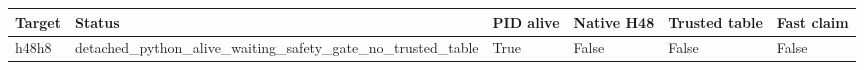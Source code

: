{\small
\begin{tabular}{llllll}
\hline
Target & Status & PID alive & Native H48 & Trusted table & Fast claim \\
\hline
h48h8 & detached\_python\_alive\_waiting\_safety\_gate\_no\_trusted\_table & True & False & False & False \\
\hline
\end{tabular}
}
